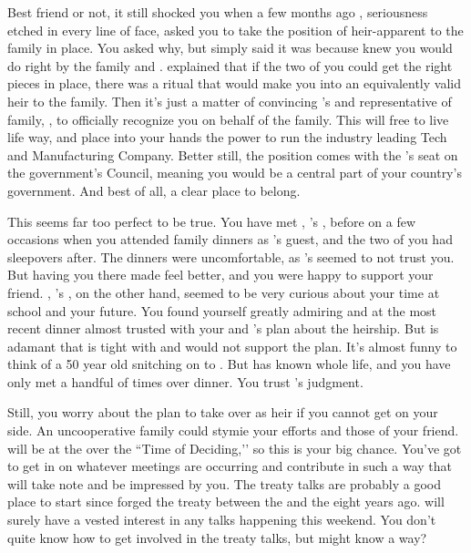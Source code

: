 \documentclass[char]{GL2020}
\begin{document}
Best friend or not, it still shocked you when a few months ago \cHeir{}, seriousness etched in every line of \cHeir{\their} face, asked you to take the position of heir-apparent to the \cHeir{\formal} family in \cHeir{\their} place. You asked \cHeir{\them} why, but \cHeir{\they} simply said it was because \cHeir{\they} knew you would do right by the family and \cTechGod{\intro}. \cHeir{} explained that if the two of you could get the right pieces in place, there was a ritual that would make you into an equivalently valid heir to the family. Then it's just a matter of convincing \cHeir{}’s \cDiplomat{\auncle} and representative of \cHeir{\their} family, \cDiplomat{\intro}, to officially recognize you on behalf of the family. This will free \cHeir{} to live life \cHeir{\their} way, and place into your hands the power to run the industry leading \cHeir{\formal} Tech and Manufacturing Company. Better still, the position comes with the \cHeir{\formal}'s seat on the government's Council, meaning you would be a central part of your country's government. And best of all, a clear place to belong.

This seems far too perfect to be true. You have met \cFaledonParent{\intro}, \cHeir{}’s \cFaledonParent{\parent}, before on a few occasions when you attended \cHeir{\formal} family dinners as \cHeir{}’s guest, and the two of you had sleepovers after. The dinners were uncomfortable, as \cHeir{}'s \cFaledonParent{\parent} seemed to not trust you. But having you there made \cHeir{} feel better, and you were happy to support your friend. \cDiplomat{\full}, \cHeir{}’s \cDiplomat{\auncle}, on the other hand, seemed to be very curious about your time at school and your future. You found yourself greatly admiring \cDiplomat{\them} and at the most recent dinner almost trusted \cDiplomat{\them} with your and \cHeir{}’s plan about the heirship. But \cHeir{} is adamant that \cDiplomat{} is tight with \cDiplomat{\their} \cFaledonParent{\sibling} and would not support the plan. It’s almost funny to think of a 50 year old \cDiplomat{\person} snitching on \cDiplomat{\their} \cHeir{\nibling} to \cHeir{\their} \cFaledonParent{\parent}. But \cHeir{} has known \cDiplomat{} \cHeir{\their} whole life, and you have only met \cDiplomat{} a handful of times over dinner. You trust \cHeir{}’s judgment.

Still, you worry about the plan to take over as heir if you cannot get \cDiplomat{} on your side. An uncooperative \cHeir{\formal} family could stymie your efforts and those of your friend. \cDiplomat{} will be at the \pSchool{} over the ``Time of Deciding,’’ so this is your big chance. You've got to get in on whatever meetings are occurring and contribute in such a way that \cDiplomat{} will take note and be impressed by you. The treaty talks are probably a good place to start since \cDiplomat{\they} forged the treaty between the \pTech{} and the \pFarm{} eight years ago. \cDiplomat{\They} will surely have a vested interest in any talks happening this weekend. You don’t quite know how to get involved in the treaty talks, but \cHeir{} might know a way?
\end{document}
